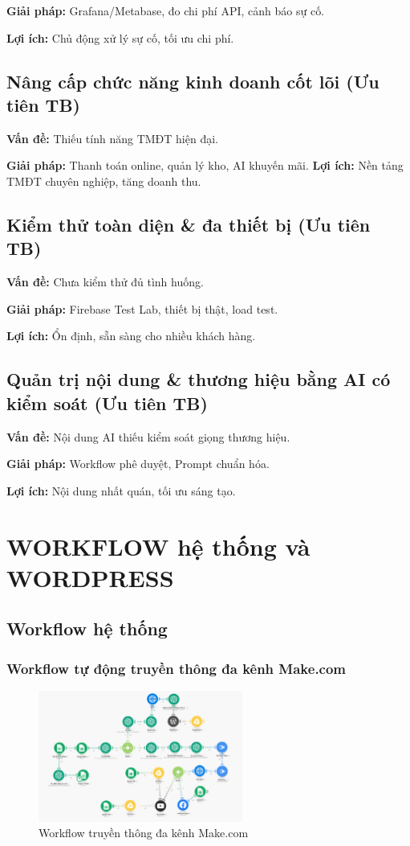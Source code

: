 \textbf{Giải pháp:} Grafana/Metabase, đo chi phí API, cảnh báo sự cố.  

\textbf{Lợi ích:} Chủ động xử lý sự cố, tối ưu chi phí.  

\subsection{Nâng cấp chức năng kinh doanh cốt lõi (Ưu tiên TB)}
\textbf{Vấn đề:} Thiếu tính năng TMĐT hiện đại.  


\textbf{Giải pháp:} Thanh toán online, quản lý kho, AI khuyến mãi.  
\textbf{Lợi ích:} Nền tảng TMĐT chuyên nghiệp, tăng doanh thu.  

\subsection{Kiểm thử toàn diện \& đa thiết bị (Ưu tiên TB)}
\textbf{Vấn đề:} Chưa kiểm thử đủ tình huống.  

\textbf{Giải pháp:} Firebase Test Lab, thiết bị thật, load test.

\textbf{Lợi ích:} Ổn định, sẵn sàng cho nhiều khách hàng.  

\subsection{Quản trị nội dung \& thương hiệu bằng AI có kiểm soát (Ưu tiên TB)}
\textbf{Vấn đề:} Nội dung AI thiếu kiểm soát giọng thương hiệu.

\textbf{Giải pháp:} Workflow phê duyệt, Prompt chuẩn hóa. 

\textbf{Lợi ích:} Nội dung nhất quán, tối ưu sáng tạo.
\section{WORKFLOW hệ thống và WORDPRESS}

\subsection{Workflow hệ thống}


\subsubsection{Workflow tự động truyền thông đa kênh Make.com}

\begin{figure}[h!]
    \centering
    \includegraphics[width=0.6\textwidth]{img/Picture10.png}
    \caption{Workflow truyền thông đa kênh Make.com}
    \label{fig:workflow-make}
\end{figure}

